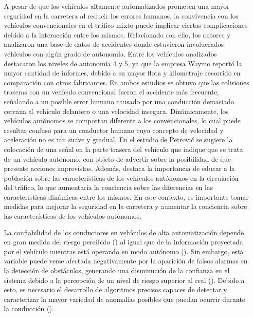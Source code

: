 A pesar de que los vehículos altamente automatizados prometen una mayor seguridad en la carretera al reducir los errores humanos, la convivencia con los vehículos convencionales en el tráfico mixto puede implicar ciertas complicaciones debido a la interacción entre los mismos. Relacionado con ello, los autores \textcite{favaro} y \textcite{petrovic} analizaron una base de datos de accidentes donde estuvieron involucrados vehículos con algún grado de autonomía. Entre los vehículos analizados destacaron los niveles de autonomía 4 y 5, ya que la empresa Waymo reportó la mayor cantidad de informes, debido a su mayor flota y kilometraje recorrido en comparación con otros fabricantes. En ambos estudios se obtuvo que las colisiones traseras con un vehículo convencional fueron el accidente más frecuente, señalando a un posible error humano causado por una conducción demasiado cercana al vehículo delantero o una velocidad insegura. Dinámicamente, los vehículos autónomos se comportan diferente a los convencionales, lo cual puede resultar confuso para un conductor humano cuyo concepto de velocidad y aceleración no es tan suave y gradual. En el estudio de Petrović se sugiere la colocación de una señal en la parte trasera del vehículo que indique que se trata de un vehículo autónomo, con objeto de advertir sobre la posibilidad de que presente acciones imprevistas. Además, destaca la importancia de educar a la población sobre las características de los vehículos autónomos en la circulación del tráfico, lo que aumentaría la conciencia sobre las diferencias en las características dinámicas entre los mismos. En este contexto, es importante tomar medidas para mejorar la seguridad en la carretera y aumentar la conciencia sobre las características de los vehículos autónomos.

La confiabilidad de los conductores en vehículos de alta automatización depende en gran medida del riesgo percibido (\cite{li19}) al igual que de la información proyectada por el vehículo mientras está operando en modo autónomo (\cite{danner}). Sin embargo, esta variable puede verse afectada negativamente por la aparición de falsos alarmas en la detección de obstáculos, generando una disminución de la confianza en el sistema debido a la percepción de un nivel de riesgo superior al real (\cite{drexler}). Debido a esto, es necesario el desarrollo de algoritmos precisos capaces de detectar y caracterizar la mayor variedad de anomalías posibles que puedan ocurrir durante la conducción (\cite{bellosalau}). 

